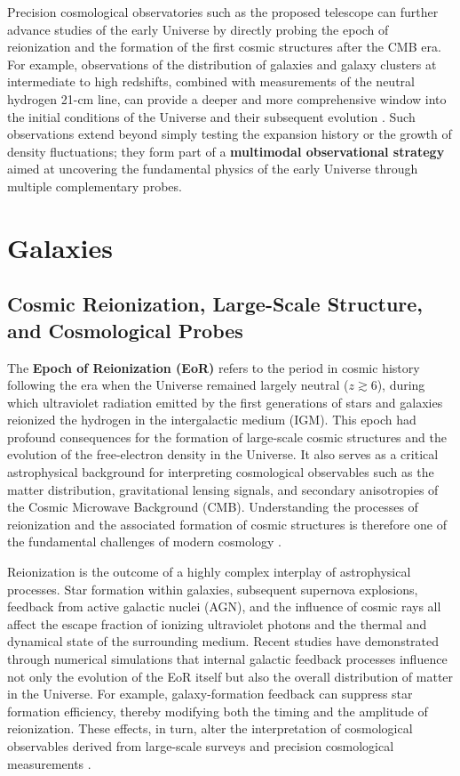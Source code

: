 Precision cosmological observatories such as the proposed telescope can further advance studies of the early Universe by directly probing the epoch of reionization and the formation of the first cosmic structures after the CMB era. For example, observations of the distribution of galaxies and galaxy clusters at intermediate to high redshifts, combined with measurements of the neutral hydrogen 21-cm line, can provide a deeper and more comprehensive window into the initial conditions of the Universe and their subsequent evolution \cite{furlanetto2006,pritchard2012}. Such observations extend beyond simply testing the expansion history or the growth of density fluctuations; they form part of a \textbf{multimodal observational strategy} aimed at uncovering the fundamental physics of the early Universe through multiple complementary probes.

\section{Galaxies}\label{galaxies}

\subsection{Cosmic Reionization, Large-Scale Structure, and Cosmological Probes}\label{cosmic-reionization-large-scale-structure-and-cosmological-probes}

The \textbf{Epoch of Reionization (EoR)} refers to the period in cosmic history following the era when the Universe remained largely neutral ($z\gtrsim6$), during which ultraviolet radiation emitted by the first generations of stars and galaxies reionized the hydrogen in the intergalactic medium (IGM). This epoch had profound consequences for the formation of large-scale cosmic structures and the evolution of the free-electron density in the Universe. It also serves as a critical astrophysical background for interpreting cosmological observables such as the matter distribution, gravitational lensing signals, and secondary anisotropies of the Cosmic Microwave Background (CMB). Understanding the processes of reionization and the associated formation of cosmic structures is therefore one of the fundamental challenges of modern cosmology \cite{ahn2019}.

Reionization is the outcome of a highly complex interplay of astrophysical processes. Star formation within galaxies, subsequent supernova explosions, feedback from active galactic nuclei (AGN), and the influence of cosmic rays all affect the escape fraction of ionizing ultraviolet photons and the thermal and dynamical state of the surrounding medium. Recent studies have demonstrated through numerical simulations that internal galactic feedback processes influence not only the evolution of the EoR itself but also the overall distribution of matter in the Universe. For example, galaxy-formation feedback can suppress star formation efficiency, thereby modifying both the timing and the amplitude of reionization. These effects, in turn, alter the interpretation of cosmological observables derived from large-scale surveys and precision cosmological measurements \cite{farcy2025}.

